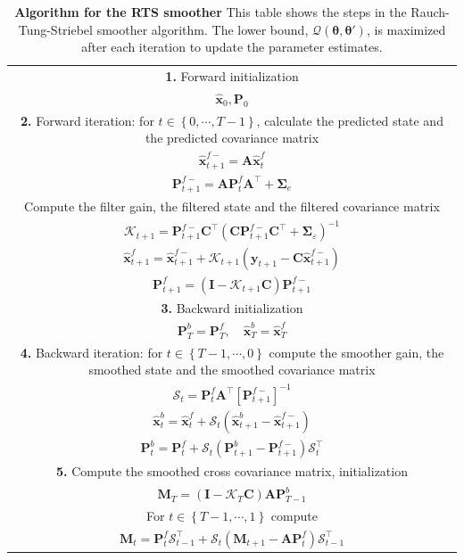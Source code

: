 \documentclass[review,authoryear,3p]{elsarticle}
\begin{document}
\begin{table}[!ht]
\begin{tabular}{|c|}\hline
\multicolumn{1}{|p{16cm}|}{\textbf{1.} Forward initialization} \\ 
$\hat{\mathbf x}_0, \mathbf P_0$ \\
\hline
\multicolumn{1}{|p{16cm}|}{\textbf{2.} Forward iteration: for $t\in\left\lbrace 0,\cdots,T-1\right\rbrace $, calculate the predicted state and the predicted covariance matrix } \\
$\hat{\mathbf x}_{t+1}^{f-}=\mathbf A \hat{\mathbf x}_{t}^{f}$  \\ 
$\mathbf P_{t+1}^{f-}=\mathbf A \mathbf P_{t}^{f}\mathbf A^{\top}+\boldsymbol\Sigma_e$  \\
\multicolumn{1}{|p{16cm}|}{Compute the filter gain, the filtered state and the filtered covariance matrix} \\
$\mathcal K_{t+1}=\mathbf P_{t +1}^{f-}\mathbf C ^\top(\mathbf C \mathbf P_{t +1}^{f-}\mathbf C ^\top+\boldsymbol \Sigma_{\varepsilon})^{-1}$\\
$\hat{\mathbf x}_{t+1}^{f}=\hat{\mathbf x}_{t+1}^{f-}+\mathcal K_{t+1}(\mathbf y_{t+1}-\mathbf C\hat{\mathbf x}_{t +1}^{f-})$\\
$\mathbf P_{t+1}^f=(\mathbf I - \mathcal K_{t+1}\mathbf C)\mathbf P_{t +1}^{f-}$\\
\hline
\multicolumn{1}{|p{16cm}|}{\textbf{3.} Backward initialization}\\
 $\mathbf P_T^b= \mathbf P_T^f, \quad \hat{\mathbf x}^b_T= \hat{\mathbf x}^f_T$\\
\hline
\multicolumn{1}{|p{16cm}|}{\textbf{4.} Backward iteration: for $t\in\left\lbrace T-1,\cdots,0\right\rbrace $ compute the smoother gain, the smoothed state and the smoothed covariance matrix}\\  
$\mathcal S_{t}=\mathbf P_{t}^{f}\mathbf A^{\top}\left[ \mathbf P_{t +1}^{f-}\right]^{-1}$ \\
 $\hat{\mathbf x}_t^b=\hat{\mathbf x}_t^f+\mathcal S_t(\hat{\mathbf x}_{t+1}^{b}-\hat{\mathbf x}_{t+1}^{f-})$ \\
 $\mathbf P_{t}^{b}=\mathbf P_{t}^{f}+\mathcal S_t(\mathbf P_{t+1}^{b}-\mathbf P_{t+1}^{f-})\mathcal S_t^\top$\\  
\hline
\multicolumn{1}{|p{16cm}|}{\textbf{5.} Compute the smoothed cross covariance matrix, initialization}\\
$\mathbf M_T=(\mathbf I-\mathcal K_T\mathbf C)\mathbf A\mathbf P_{T-1}^b$\\
\multicolumn{1}{|p{16cm}|}{For $t\in\left\lbrace T-1,\cdots,1\right\rbrace $ compute}\\
$\mathbf M_t= \mathbf P_t^{f}\mathcal S_{t-1}^{\top}+\mathcal S_{t}(\mathbf M_{t+1}-\mathbf A\mathbf P_t^{f} )\mathcal S_{t-1}^{\top}$\\
\hline
\end{tabular}
\caption{\textbf{Algorithm for the RTS smoother} This table shows the steps in the  Rauch-Tung-Striebel smoother algorithm. The lower bound, $\mathcal{Q}(\boldsymbol{\theta},\boldsymbol{\theta'})$, is maximized after each iteration to update the parameter estimates.}
\label{alg:MRA-RTS}
\end{table}
\renewcommand{\arraystretch}{1}
\end{document}
